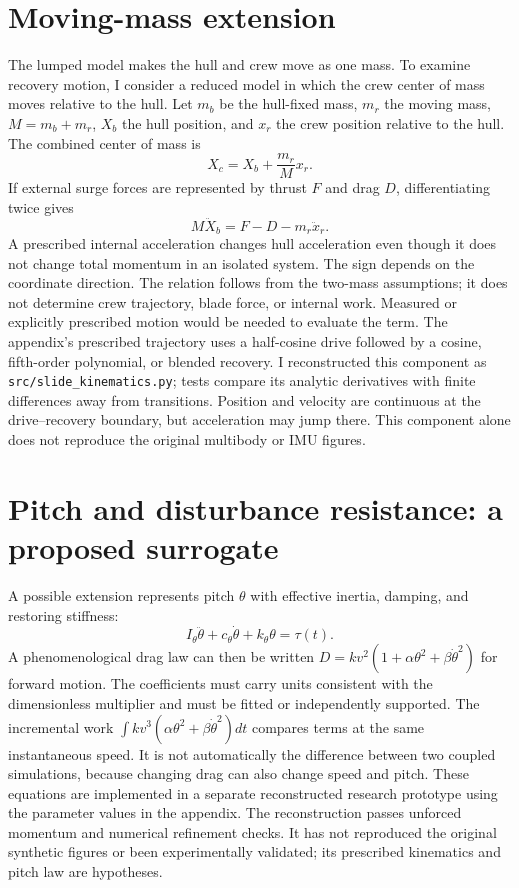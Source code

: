 \documentclass[11pt]{article}
\begin{document}
\section{Moving-mass extension}
The lumped model makes the hull and crew move as one mass. To examine recovery motion, I consider a reduced model in which the crew center of mass moves relative to the hull. Let $m_b$ be the hull-fixed mass, $m_r$ the moving mass, $M=m_b+m_r$, $X_b$ the hull position, and $x_r$ the crew position relative to the hull. The combined center of mass is
\begin{equation}X_c=X_b+\frac{m_r}{M}x_r.\end{equation}
If external surge forces are represented by thrust $F$ and drag $D$, differentiating twice gives
\begin{equation}M\ddot X_b=F-D-m_r\ddot x_r.\end{equation}
A prescribed internal acceleration changes hull acceleration even though it does not change total momentum in an isolated system. The sign depends on the coordinate direction. The relation follows from the two-mass assumptions; it does not determine crew trajectory, blade force, or internal work. Measured or explicitly prescribed motion would be needed to evaluate the term. The appendix's prescribed trajectory uses a half-cosine drive followed by a cosine, fifth-order polynomial, or blended recovery. I reconstructed this component as \texttt{src/slide\_kinematics.py}; tests compare its analytic derivatives with finite differences away from transitions. Position and velocity are continuous at the drive--recovery boundary, but acceleration may jump there. This component alone does not reproduce the original multibody or IMU figures.

\section{Pitch and disturbance resistance: a proposed surrogate}
A possible extension represents pitch $\theta$ with effective inertia, damping, and restoring stiffness:
\begin{equation}I_\theta\ddot\theta+c_\theta\dot\theta+k_\theta\theta=\tau(t).\end{equation}
A phenomenological drag law can then be written $D=kv^2(1+\alpha\theta^2+\beta\dot\theta^2)$ for forward motion. The coefficients must carry units consistent with the dimensionless multiplier and must be fitted or independently supported. The incremental work $\int kv^3(\alpha\theta^2+\beta\dot\theta^2)dt$ compares terms at the same instantaneous speed. It is not automatically the difference between two coupled simulations, because changing drag can also change speed and pitch. These equations are implemented in a separate reconstructed research prototype using the parameter values in the appendix. The reconstruction passes unforced momentum and numerical refinement checks. It has not reproduced the original synthetic figures or been experimentally validated; its prescribed kinematics and pitch law are hypotheses.
\end{document}
